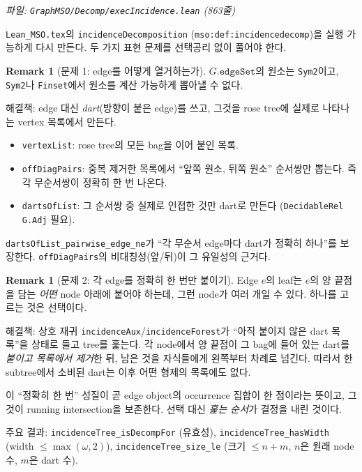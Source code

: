 \documentclass[11pt]{article}
\theoremstyle{definition}
\newtheorem{remark}[definition]{Remark}
\theoremstyle{plain}
\newcommand{\lean}[1]{\texttt{#1}}
\newcommand{\leanfile}[1]{\texttt{#1}}
\begin{document}
\emph{파일: \leanfile{GraphMSO/Decomp/execIncidence.lean} (863줄)}

\leanfile{Lean\_MSO.tex}의 \lean{incidenceDecomposition}
(\lean{mso:def:incidencedecomp})을 실행 가능하게 다시 만든다. 두 가지 표현
문제를 선택공리 없이 풀어야 한다.

\begin{remark}[문제 1: edge를 어떻게 열거하는가]
\label{alg:rem:edgeenum}
$G.\lean{edgeSet}$의 원소는 \lean{Sym2}이고, \lean{Sym2}나 \lean{Finset}에서
원소를 계산 가능하게 뽑아낼 수 없다.

해결책: edge 대신 \emph{dart}(방향이 붙은 edge)를 쓰고, 그것을 rose tree에
실제로 나타나는 vertex 목록에서 만든다.
\begin{itemize}
  \item \lean{vertexList}: rose tree의 모든 bag을 이어 붙인 목록.
  \item \lean{offDiagPairs}: 중복 제거한 목록에서 ``앞쪽 원소, 뒤쪽 원소''
    순서쌍만 뽑는다. 즉 각 무순서쌍이 정확히 한 번 나온다.
  \item \lean{dartsOfList}: 그 순서쌍 중 실제로 인접한 것만 dart로 만든다
    (\lean{DecidableRel G.Adj} 필요).
\end{itemize}
\lean{dartsOfList\_pairwise\_edge\_ne}가 ``각 무순서 edge마다 dart가 정확히
하나''를 보장한다. \lean{offDiagPairs}의 비대칭성(앞/뒤)이 그 유일성의
근거다.
\end{remark}

\begin{remark}[문제 2: 각 edge를 정확히 한 번만 붙이기]
\label{alg:rem:exactlyonce}
Edge $e$의 leaf는 $e$의 양 끝점을 담는 \emph{어떤} node 아래에 붙어야 하는데,
그런 node가 여러 개일 수 있다. 하나를 고르는 것은 선택이다.

해결책: 상호 재귀 \lean{incidenceAux}/\lean{incidenceForest}가 ``아직 붙이지
않은 dart 목록''을 상태로 들고 tree를 훑는다. 각 node에서 양 끝점이 그 bag에
들어 있는 dart를 \emph{붙이고 목록에서 제거}한 뒤, 남은 것을 자식들에게
왼쪽부터 차례로 넘긴다. 따라서 한 subtree에서 소비된 dart는 이후 어떤 형제의
목록에도 없다.

이 ``정확히 한 번'' 성질이 곧 edge object의 occurrence 집합이 한 점이라는
뜻이고, 그것이 running intersection을 보존한다. 선택 대신 \emph{훑는 순서}가
결정을 내린 것이다.
\end{remark}

주요 결과: \lean{incidenceTree\_isDecompFor} (유효성),
\lean{incidenceTree\_hasWidth} (width $\le \max(\omega,2)$),
\lean{incidenceTree\_size\_le} (크기 $\le n + m$, $n$은 원래 node 수,
$m$은 dart 수).
\end{document}
